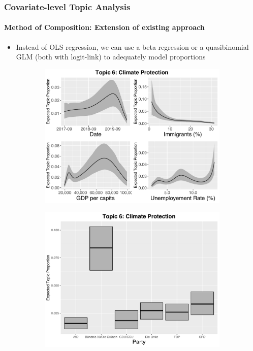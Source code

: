 \documentclass[xcolor=dvipsnames]{beamer}
\begin{document}
\begin{frame}
\frametitle{Covariate-level Topic Analysis}
\framesubtitle{Method of Composition: Extension of existing approach}
\begin{itemize}
\item Instead of OLS regression, we can use a beta regression or a quasibinomial GLM (both with logit-link) to adequately model proportions
\end{itemize}
\begin{figure}[h!]
  \centering
  \captionsetup{justification=centering,margin=2cm}
  \begin{subfigure}[b]{0.4\linewidth}
    \includegraphics[width=\linewidth]{../plots/presentation/quasi_t6_cont.pdf}
  \end{subfigure}
  \begin{subfigure}[b]{0.4\linewidth}
    \includegraphics[width=\linewidth]{../plots/presentation/quasi_t6_cat.pdf}
  \end{subfigure}
\end{figure}
\end{frame}
\end{document}
